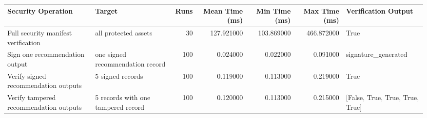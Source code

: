 \begin{tabular}{llrrrrl}
\toprule
Security Operation & Target & Runs & Mean Time (ms) & Min Time (ms) & Max Time (ms) & Verification Output \\
\midrule
Full security manifest verification & all protected assets & 30 & 127.921000 & 103.869000 & 466.872000 & True \\
Sign one recommendation output & one signed recommendation record & 100 & 0.024000 & 0.022000 & 0.091000 & signature\_generated \\
Verify signed recommendation outputs & 5 signed records & 100 & 0.119000 & 0.113000 & 0.219000 & True \\
Verify tampered recommendation outputs & 5 records with one tampered record & 100 & 0.120000 & 0.113000 & 0.215000 & [False, True, True, True, True] \\
\bottomrule
\end{tabular}
